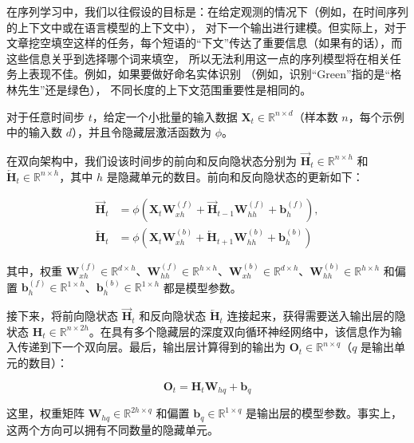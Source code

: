 在序列学习中，我们以往假设的目标是：在给定观测的情况下（例如，在时间序列的上下文中或在语言模型的上下文中）， 对下一个输出进行建模。但实际上，对于文章挖空填空这样的任务，每个短语的``下文''传达了重要信息（如果有的话），而这些信息关乎到选择哪个词来填空， 所以无法利用这一点的序列模型将在相关任务上表现不佳。例如，如果要做好命名实体识别 （例如，识别``Green''指的是``格林先生''还是绿色）， 不同长度的上下文范围重要性是相同的。

对于任意时间步 \(t\)，给定一个小批量的输入数据 \(\mathbf{X}_t \in \mathbb{R}^{n \times d}\)（样本数 \(n\)，每个示例中的输入数 \(d\)），并且令隐藏层激活函数为 \(\phi\)。

在双向架构中，我们设该时间步的前向和反向隐状态分别为 \(\overrightarrow{\mathbf{H}}_t \in \mathbb{R}^{n \times h}\) 和 \(\overleftarrow{\mathbf{H}}_t \in \mathbb{R}^{n \times h}\)，其中 \(h\) 是隐藏单元的数目。前向和反向隐状态的更新如下：

\[
\begin{aligned}
\overrightarrow{\mathbf{H}}_t &= \phi(\mathbf{X}_t\mathbf{W}_{xh}^{(f)} + \overrightarrow{\mathbf{H}}_{t-1}\mathbf{W}_{hh}^{(f)} + \mathbf{b}_h^{(f)}), \\
\overleftarrow{\mathbf{H}}_t &= \phi(\mathbf{X}_t\mathbf{W}_{xh}^{(b)} + \overleftarrow{\mathbf{H}}_{t+1}\mathbf{W}_{hh}^{(b)} + \mathbf{b}_h^{(b)})
\end{aligned}
\]

其中，权重 \(\mathbf{W}_{xh}^{(f)} \in \mathbb{R}^{d \times h}\)、\(\mathbf{W}_{hh}^{(f)} \in \mathbb{R}^{h \times h}\)、\(\mathbf{W}_{xh}^{(b)} \in \mathbb{R}^{d \times h}\)、\(\mathbf{W}_{hh}^{(b)} \in \mathbb{R}^{h \times h}\) 和偏置 \(\mathbf{b}_h^{(f)} \in \mathbb{R}^{1 \times h}\)、\(\mathbf{b}_h^{(b)} \in \mathbb{R}^{1 \times h}\) 都是模型参数。

接下来，将前向隐状态 \(\overrightarrow{\mathbf{H}}_t\) 和反向隐状态 \(\overleftarrow{\mathbf{H}}_t\) 连接起来，获得需要送入输出层的隐状态 \(\mathbf{H}_t \in \mathbb{R}^{n \times 2h}\)。在具有多个隐藏层的深度双向循环神经网络中，该信息作为输入传递到下一个双向层。最后，输出层计算得到的输出为 \(\mathbf{O}_t \in \mathbb{R}^{n \times q}\)（\(q\) 是输出单元的数目）：

\[
\mathbf{O}_t = \mathbf{H}_t\mathbf{W}_{hq} + \mathbf{b}_q
\]

这里，权重矩阵 \(\mathbf{W}_{hq} \in \mathbb{R}^{2h \times q}\) 和偏置 \(\mathbf{b}_q \in \mathbb{R}^{1 \times q}\) 是输出层的模型参数。事实上，这两个方向可以拥有不同数量的隐藏单元。

